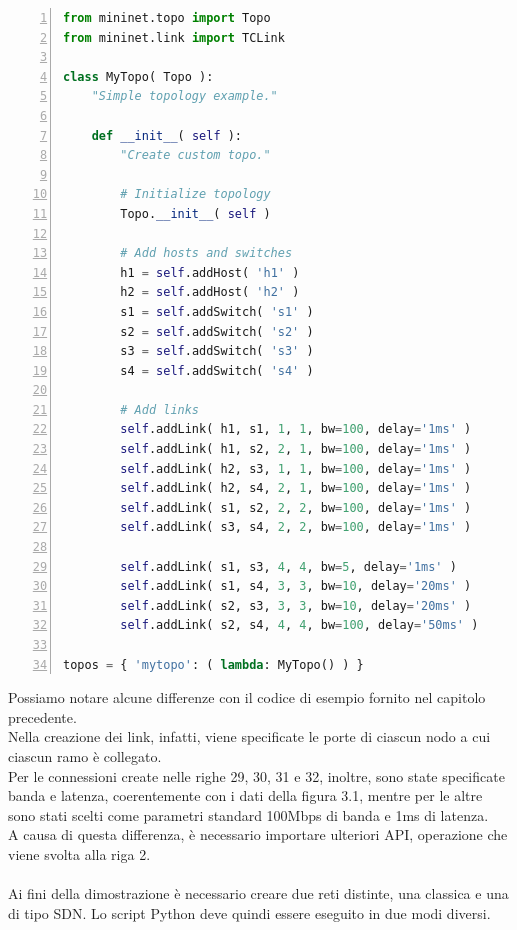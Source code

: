 \begin{lstlisting}[language=Python,numbers=left,firstnumber=1,stepnumber=1]
from mininet.topo import Topo
from mininet.link import TCLink
	
class MyTopo( Topo ):
	"Simple topology example."
	
	def __init__( self ):
		"Create custom topo."
	
		# Initialize topology
		Topo.__init__( self )
	
		# Add hosts and switches
		h1 = self.addHost( 'h1' )
		h2 = self.addHost( 'h2' )
		s1 = self.addSwitch( 's1' )
		s2 = self.addSwitch( 's2' )
		s3 = self.addSwitch( 's3' )
		s4 = self.addSwitch( 's4' )
	
		# Add links
		self.addLink( h1, s1, 1, 1, bw=100, delay='1ms' )
		self.addLink( h1, s2, 2, 1, bw=100, delay='1ms' )
		self.addLink( h2, s3, 1, 1, bw=100, delay='1ms' )
		self.addLink( h2, s4, 2, 1, bw=100, delay='1ms' )
		self.addLink( s1, s2, 2, 2, bw=100, delay='1ms' )
		self.addLink( s3, s4, 2, 2, bw=100, delay='1ms' )
		
		self.addLink( s1, s3, 4, 4, bw=5, delay='1ms' )
		self.addLink( s1, s4, 3, 3, bw=10, delay='20ms' )
		self.addLink( s2, s3, 3, 3, bw=10, delay='20ms' )
		self.addLink( s2, s4, 4, 4, bw=100, delay='50ms' )
	
topos = { 'mytopo': ( lambda: MyTopo() ) }
\end{lstlisting}
Possiamo notare alcune differenze con il codice di esempio fornito nel capitolo precedente.\\
Nella creazione dei link, infatti, viene specificate le porte di ciascun nodo a cui ciascun ramo è collegato.\\
Per le connessioni create nelle righe 29, 30, 31 e 32, inoltre, sono state specificate banda e latenza, coerentemente con i dati della figura 3.1, mentre per le altre sono stati scelti come parametri standard 100Mbps di banda e 1ms di latenza.\\
A causa di questa differenza, è necessario importare ulteriori API, operazione che viene svolta alla riga 2.\\\\
Ai fini della dimostrazione è necessario creare due reti distinte, una classica e una di tipo SDN. Lo script Python deve quindi essere eseguito in due modi diversi.

